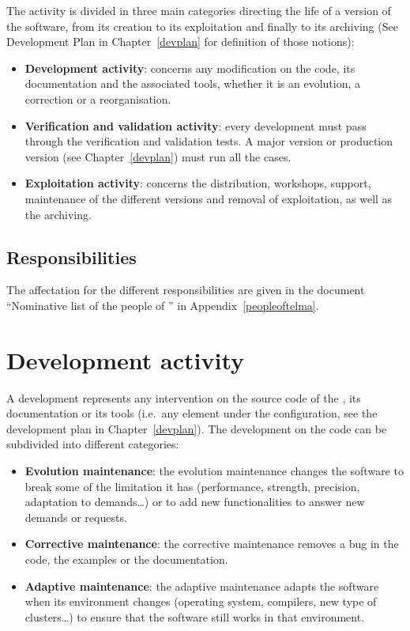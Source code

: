 The \telemacsystem{} activity is divided in three main categories directing the
life of a version of the software, from its creation to its exploitation and
finally to its archiving (See Development Plan in Chapter~\ref{devplan} for
definition of those notions):
\begin{itemize}
\item \textbf{Development activity}: concerns any modification on the code, its
  documentation and the associated tools, whether it is an evolution, a
  correction or a reorganisation.
\item \textbf{Verification and validation activity}: every development must
  pass through the verification and validation tests. A major version or
  production version (see Chapter~\ref{devplan}) must run all the cases.
\item \textbf{Exploitation activity}: concerns the distribution, workshops,
  support, maintenance of the different versions and removal of exploitation,
  as well as the archiving.
\end{itemize}

\subsection{Responsibilities}

The affectation for the different responsibilities are given in the document
``Nominative list of the people of \telemacsystem'' in
Appendix~\ref{peopleoftelma}.

\section{Development activity}
\label{devact}

A development represents any intervention on the source code of the
\telemacsystem, its documentation or its tools (i.e.\ any element under the
configuration, see the development plan in Chapter~\ref{devplan}). The
development on the code can be subdivided into different categories:
\begin{itemize}
\item \textbf{Evolution maintenance}: the evolution maintenance changes the
  software to break some of the limitation it has (performance, strength,
  precision, adaptation to demands\ldots) or to add new functionalities to
  answer new demands or requests.
\item \textbf{Corrective maintenance}: the corrective maintenance removes a bug
  in the code, the examples or the documentation.
\item \textbf{Adaptive maintenance}: the adaptive maintenance adapts the
  software when its environment changes (operating system, compilers, new type
  of clusters\ldots) to ensure that the software still works in that
  environment.
\end{itemize}


